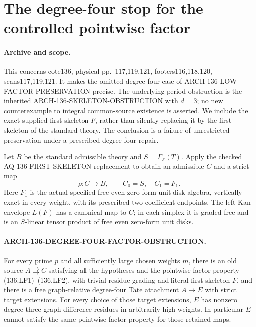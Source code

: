 \section{The degree-four stop for the controlled pointwise factor}
\label{sec:136-degree-four-factor-obstruction}

\paragraph{Archive and scope.}
This concerns cote136, physical pp.~117,119,121,
footers116,118,120, scans117,119,121.  It makes the omitted
degree-four case of ARCH-136-LOW-FACTOR-PRESERVATION precise.
The underlying period obstruction is the inherited
ARCH-136-SKELETON-OBSTRUCTION with \(d=3\); no new
counterexample to integral common-source existence is asserted.
We include the exact supplied first skeleton \(F\), rather
than silently replacing it by the first skeleton of the
standard theory.  The conclusion is a failure of unrestricted
preservation under a prescribed degree-four repair.

Let \(B\) be the standard admissible theory and
\(S=\Gamma_{\mathbb Z}(T)\).  Apply the checked
AQ-136-FIRST-SKELETON replacement to obtain an admissible
\(C\) and a strict map
\[
                            \rho:C\longrightarrow B,
                 \qquad C_0=S,\quad C_1=F_1.
                                                               \tag{136.DF1}
\]
Here \(F_1\) is the actual specified free even zero-form
unit-disk algebra, vertically exact in every weight, with its
prescribed two coefficient endpoints.  The left Kan envelope
\(L(F)\) has a canonical map to \(C\); in each simplex
it is graded free and is an \(S\)-linear tensor product of
free even zero-form unit disks.

\paragraph{ARCH-136-DEGREE-FOUR-FACTOR-OBSTRUCTION.}
For every prime \(p\) and all sufficiently large chosen
weights \(m\), there is an old source
\(A\rightrightarrows C\) satisfying all the hypotheses
and the pointwise factor property (136.LF1)--(136.LF2),
with trivial residue grading and literal first skeleton \(F\),
and there is a free graph-relative degree-four Tate attachment
\(A\to E\) with strict target extensions.  For every
choice of those target extensions, \(E\) has nonzero
degree-three graph-difference residues in arbitrarily high
weights.  In particular \(E\) cannot satisfy the same
pointwise factor property for those retained maps.

